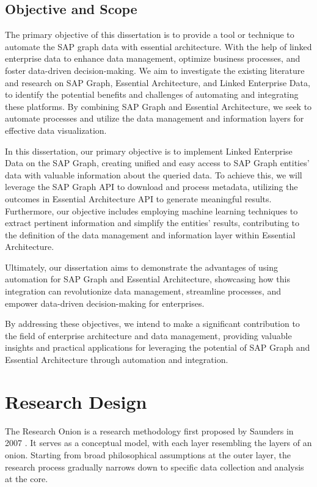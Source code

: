 \documentclass{article}
\begin{document}
\subsection{Objective and Scope}
The primary objective of this dissertation is to provide a tool or technique to automate the SAP graph data with essential architecture. With the help of linked enterprise data to enhance data management, optimize business processes, and foster data-driven decision-making. We aim to investigate the existing literature and research on SAP Graph, Essential Architecture, and Linked Enterprise Data, to identify the potential benefits and challenges of automating and integrating these platforms. By combining SAP Graph and Essential Architecture, we seek to automate processes and utilize the data management and information layers for effective data visualization. 

In this dissertation, our primary objective is to implement Linked Enterprise Data on the SAP Graph, creating unified and easy access to SAP Graph entities' data with valuable information about the queried data. To achieve this, we will leverage the SAP Graph API to download and process metadata, utilizing the outcomes in Essential Architecture API to generate meaningful results. Furthermore, our objective includes employing machine learning techniques to extract pertinent information and simplify the entities' results, contributing to the definition of the data management and information layer within Essential Architecture.

Ultimately, our dissertation aims to demonstrate the advantages of using automation for SAP Graph and Essential Architecture, showcasing how this integration can revolutionize data management, streamline processes, and empower data-driven decision-making for enterprises.

By addressing these objectives, we intend to make a significant contribution to the field of enterprise architecture and data management, providing valuable insights and practical applications for leveraging the potential of SAP Graph and Essential Architecture through automation and integration.

\maketitle
\section{Research Design}
The Research Onion is a research methodology first proposed by Saunders in 2007 \parencite{sahay2016}. It serves as a conceptual model, with each layer resembling the layers of an onion. Starting from broad philosophical assumptions at the outer layer, the research process gradually narrows down to specific data collection and analysis at the core.
\end{document}
